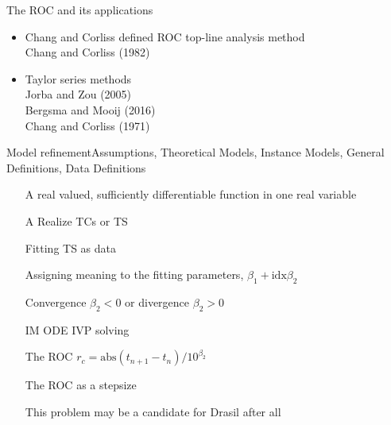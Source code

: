 \documentclass[11pt,svgnames,fleqn]{beamer}
\newcommand{\EC}[1]{{\color{Blue}#1}}
\begin{document}
\begin{frame}{The ROC and its applications}

\begin{itemize}
  \item Chang and Corliss defined ROC top-line analysis method\\
    \EC{\footnotesize Chang and Corliss (1982)}

  \vspace{5mm}

  \item Taylor series methods\\
    \vspace{1mm}
    \EC{\footnotesize
      Jorba and Zou (2005)\\
      \vspace{1mm}
      Bergsma and Mooij (2016)\\
      \vspace{1mm}
      Chang and Corliss (1971)
    }
\end{itemize}

\end{frame}

\begin{frame}{Model refinement}{Assumptions, Theoretical Models, Instance Models, General Definitions, Data Definitions}

\begin{itemize}
  \item[A] real valued, sufficiently differentiable function in one real variable
  \item[A] Realize TCs or TS
  \item[] Fitting TS as data
  \item[] Assigning meaning to the fitting parameters, $\beta_1 + \text{idx} \beta_2$
  \item[] Convergence $\beta_2 < 0$ or divergence $\beta_2 > 0$
  \item[IM] ODE IVP solving
  \item[] The ROC $r_c = \text{abs}(t_{n+1} - t_{n}) / 10^{\beta_2}$
  \item[] The ROC as a stepsize
  \item[] This problem may be a candidate for Drasil after all
\end{itemize}


\end{frame}
\end{document}
